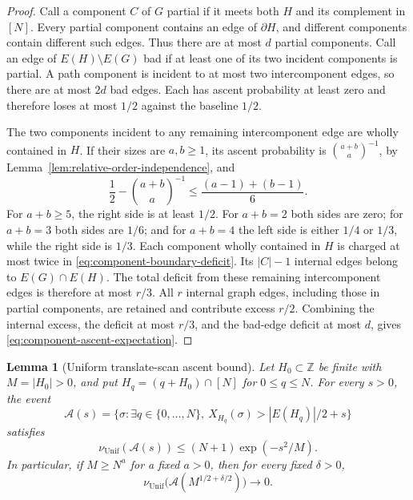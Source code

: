 \documentclass[11pt]{article}
\numberwithin{equation}{section}
\newtheorem{lemma}[lemma]{Lemma}
\newcommand{\Unif}{\mathrm{Unif}}
\newcommand{\1}{\mathbf 1}
\newcommand{\nuUnif}{\nu_{\Unif}}
\begin{document}
\begin{proof}
Call a component \(C\) of \(G\) partial if it meets both \(H\)
and its complement in \([N]\).  Every partial component contains an
edge of \(\partial H\), and different components contain different
such edges.  Thus there are at most \(d\) partial components.
Call an edge of \(E(H)\setminus E(G)\) bad if at least one of its
two incident components is partial.  A path component is incident to
at most two intercomponent edges, so there are at most \(2d\) bad
edges.  Each has ascent probability at least zero and therefore loses
at most \(1/2\) against the baseline \(1/2\).

The two components incident to any remaining intercomponent edge are
wholly contained in \(H\).  If their sizes are \(a,b\ge1\), its
ascent probability is \(\binom{a+b}{a}^{-1}\), by
Lemma~\ref{lem:relative-order-independence}, and
\begin{equation}
\label{eq:component-boundary-deficit}
  \frac12-\binom{a+b}{a}^{-1}
  \le \frac{(a-1)+(b-1)}6.
\end{equation}
For \(a+b\ge5\), the right side is at least \(1/2\).
For \(a+b=2\) both sides are zero; for \(a+b=3\) both sides are
\(1/6\); and for \(a+b=4\) the left side is either \(1/4\)
or \(1/3\), while the right side is \(1/3\).
Each component wholly contained in \(H\) is charged at most twice
in \eqref{eq:component-boundary-deficit}.  Its \(|C|-1\) internal
edges belong to \(E(G)\cap E(H)\).  The total deficit from these
remaining intercomponent edges is therefore at most \(r/3\).
All \(r\) internal graph edges, including those in partial components,
are retained and contribute excess \(r/2\).  Combining the internal
excess, the deficit at most \(r/3\), and the bad-edge deficit at most
\(d\), gives \eqref{eq:component-ascent-expectation}.
\end{proof}

\begin{lemma}[Uniform translate-scan ascent bound]
\label{lem:uniform-ascent}
Let \(H_0\subset\mathbb Z\) be finite with \(M=|H_0|>0\),
and put \(H_q=(q+H_0)\cap[N]\) for \(0\le q\le N\).
For every \(s>0\), the event
\[
  \mathcal A(s)=
  \{\sigma:\exists q\in\{0,\ldots,N\},\
          X_{H_q}(\sigma)>|E(H_q)|/2+s\}
\]
satisfies
\begin{equation}
\label{eq:uniform-ascent-scan-finite}
  \nuUnif(\mathcal A(s))\le (N+1)\exp(-s^2/M).
\end{equation}
In particular, if \(M\ge N^a\) for a fixed \(a>0\), then for
every fixed \(\delta>0\),
\[
  \nuUnif\bigl(\mathcal A(M^{1/2+\delta/2})\bigr)\longrightarrow0.
\]
\end{lemma}
\end{document}

